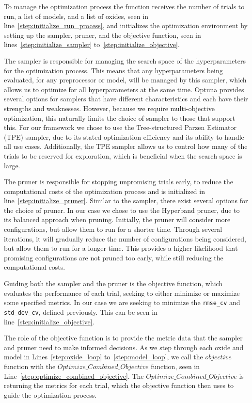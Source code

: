 To manage the optimization process the function receives the number of trials to run, a list of models, and a list of oxides, seen in line~\ref{step:initialize_run_process}, and initializes the optimization environment by setting up the sampler, pruner, and the objective function, seen in lines~\ref{step:initialize_sampler} to~\ref{step:initialize_objective}.

The sampler is responsible for managing the search space of the hyperparameters for the optimization process.
This means that any hyperparameters being evaluated, for any preprocessor or model, will be managed by this sampler, which allows us to optimize for all hyperparameters at the same time.
Optuna provides several options for samplers that have different characteristics and each have their strengths and weaknesses.
However, because we require multi-objective optimization, this naturally limits the choice of sampler to those that support this.
For our framework we chose to use the Tree-structured Parzen Estimator (TPE) sampler, due to its stated optimization efficiency and its ability to handle all use cases. 
Additionally, the TPE sampler allows us to control how many of the trials to be reserved for exploration, which is beneficial when the search space is large\cite{optuna_2019}.

The pruner is responsible for stopping unpromising trials early, to reduce the computational costs of the optimization process and is initialized in line~\ref{step:initialize_pruner}.
Similar to the sampler, there exist several options for the choice of pruner.
In our case we chose to use the Hyperband pruner, due to its balanced approach when pruning.
Initially, the pruner will consider more configurations, but allow them to run for a shorter time.
Through several iterations, it will gradually reduce the number of configurations being considered, but allow them to run for a longer time.
This provides a higher likelihood that promising configurations are not pruned too early, while still reducing the computational costs.\cite{optuna_2019}

Guiding both the sampler and the pruner is the objective function, which evaluates the performance of each trial, seeking to either minimize or maximize some specified metrics.
In our case we are seeking to minimize the \texttt{rmse\_cv} and \texttt{std\_dev\_cv}, defined previously.
This can be seen in line~\ref{step:initialize_objective}.

The role of the objective function is to provide the metric data that the sampler and pruner need to make informed decisions.
As we step through each oxide and model in Lines~\ref{step:oxide_loop} to~\ref{step:model_loop}, we call the $objective$ function with the $Optimize\_Combined\_Objective$ function, seen in Line~\ref{step:optimize_combined_objective}.
The $Optimize\_Combined\_Objective$ is returning the metrics for each trial, which the objective function then uses to guide the optimization process.

